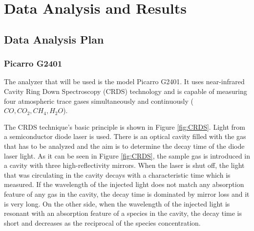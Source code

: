 \documentclass[a4paper,12pt,twoside]{article}
\begin{document}



\pagebreak
\section{Data Analysis and Results}

\subsection{Data Analysis Plan}

\subsubsection{Picarro G2401}

The analyzer that will be used is the model Picarro G2401. It uses near-infrared Cavity Ring Down Spectroscopy (CRDS) technology and is capable of measuring four atmospheric trace gases simultaneously and continuously ($CO, CO_2, CH_4, H_2O$).

The CRDS technique's basic principle is shown in Figure \ref{fig:CRDS}. Light from a semiconductor diode laser is used. There is an optical cavity filled with the gas that has to be analyzed and the aim is to determine the decay time of the diode laser light. As it can be seen in Figure \ref{fig:CRDS}, the sample gas is introduced in a cavity with three high-reflectivity mirrors. When the laser is shut off, the light that was circulating in the cavity decays with a characteristic time which is measured. If the wavelength of the injected light does not match any absorption feature of any gas in the cavity, the decay time is dominated by mirror loss and it is very long. On the other side, when the wavelength of the injected light is resonant with an absorption feature of a species in the cavity, the decay time is short and decreases as the reciprocal of the species concentration.
\end{document}
